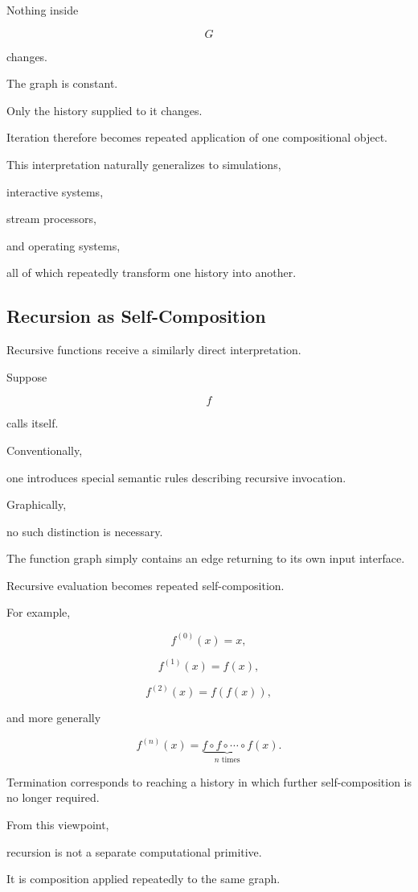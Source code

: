 \documentclass[12pt,oneside]{article}
\begin{document}
Nothing inside

\[
G
\]

changes.

The graph is constant.

Only the history supplied to it changes.

Iteration therefore becomes repeated application of one compositional object.

This interpretation naturally generalizes to simulations,

interactive systems,

stream processors,

and operating systems,

all of which repeatedly transform one history into another.

\subsection{Recursion as Self-Composition}

Recursive functions receive a similarly direct interpretation.

Suppose

\[
f
\]

calls itself.

Conventionally,

one introduces special semantic rules describing recursive invocation.

Graphically,

no such distinction is necessary.

The function graph simply contains an edge returning to its own input interface.

Recursive evaluation becomes repeated self-composition.

For example,

\[
f^{(0)}(x)=x,
\]

\[
f^{(1)}(x)=f(x),
\]

\[
f^{(2)}(x)=f(f(x)),
\]

and more generally

\[
f^{(n)}(x)
=
\underbrace{f\circ f\circ\cdots\circ f}_{n\text{ times}}(x).
\]

Termination corresponds to reaching a history in which further self-composition is no longer required.

From this viewpoint,

recursion is not a separate computational primitive.

It is composition applied repeatedly to the same graph.
\end{document}
